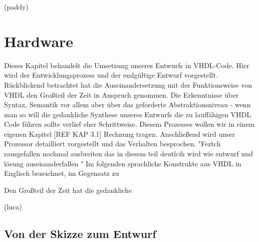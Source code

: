 \documentclass[paper=a4,fontsize=12pt,twocolumn]{scrreprt}
\begin{document}
(paddy)

\chapter{Hardware}


Dieses Kapitel behandelt die Umsetzung unseres Entwurfs in VHDL-Code. Hier wird der Entwicklungsprozess und der endgültige Entwurf vorgestellt. Rückblickend betrachtet hat die Auseinandersetzung mit der Funktionsweise von VHDL den Großteil der Zeit in Anspruch genommen. Die Erkenntnisse über Syntax, Semantik vor allem aber über das geforderte Abstraktionsniveau - wenn man so will die gedankliche Synthese unseres Entwurfs die zu lauffähigen VHDL Code führen sollte verlief eher Schrittweise. Diesem Prozesses wollen wir in einem eigenen Kapitel [REF KAP 3.1] Rechnung tragen. Anschließend wird unser Prozessor detailliert vorgestellt und das Verhalten besprochen. "Feztch rausgefallen nochmal ausbreiten das in diesem teil deutlcih wird wie entwurf und lösung auseioanderfallen
" Im folgenden sprachliche Konstrukte aus VHDL in Englisch bezeichnet, im Gegensatz zu      


Den Großteil der Zeit hat die gedankliche  



(luca)

\section{Von der Skizze zum Entwurf}
\end{document}
